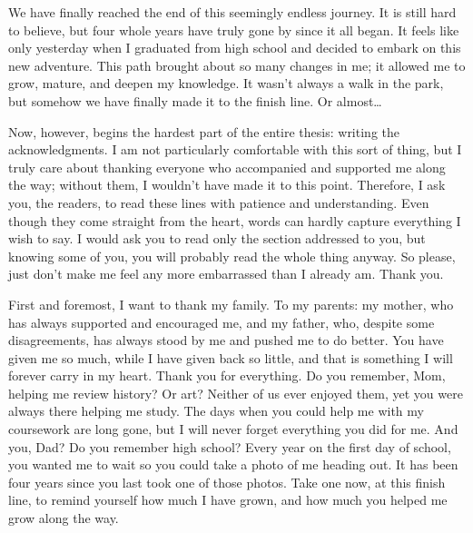 \documentclass[english, oneside]{sapthesis}
\begin{document}
\mainmatter








\backmatter
\cleardoublepage
{}
{}



\cleardoublepage
{}
{}

\begin{acknowledgments}
\enlargethispage{\baselineskip}
We have finally reached the end of this seemingly endless journey. It is still hard to believe, but four whole years have truly gone by since it all began.
It feels like only yesterday when I graduated from high school and decided to embark on this new adventure.
This path brought about so many changes in me; it allowed me to grow, mature, and deepen my knowledge. It wasn't always a walk in the park, but somehow we have finally made it to the finish line. Or almost\ldots

\medskip

Now, however, begins the hardest part of the entire thesis: writing the acknowledgments. I am not particularly comfortable with this sort of thing, but I truly care about thanking everyone who accompanied and supported me along the way; without them, I wouldn't have made it to this point.
Therefore, I ask you, the readers, to read these lines with patience and understanding. Even though they come straight from the heart, words can hardly capture everything I wish to say.
I would ask you to read only the section addressed to you, but knowing some of you, you will probably read the whole thing anyway. So please, just don't make me feel any more embarrassed than I already am. Thank you.

\medskip

First and foremost, I want to thank my family. To my parents: my mother, who has always supported and encouraged me, and my father, who, despite some disagreements, has always stood by me and pushed me to do better. You have given me so much, while I have given back so little, and that is something I will forever carry in my heart. Thank you for everything.
Do you remember, Mom, helping me review history? Or art? Neither of us ever enjoyed them, yet you were always there helping me study. The days when you could help me with my coursework are long gone, but I will never forget everything you did for me.
And you, Dad? Do you remember high school? Every year on the first day of school, you wanted me to wait so you could take a photo of me heading out. It has been four years since you last took one of those photos. Take one now, at this finish line, to remind yourself how much I have grown, and how much you helped me grow along the way.


\end{acknowledgments}
\end{document}
